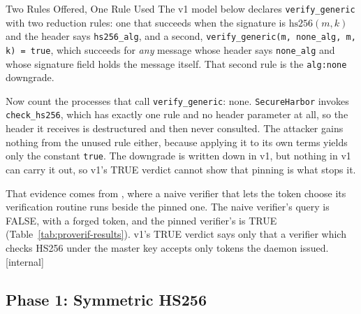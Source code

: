 \documentclass[11pt,a4paper]{article}
\theoremstyle{definition}
\begin{document}
\begin{pdexample}{Two Rules Offered, One Rule Used}
\setlength{\parskip}{4pt plus 1pt}
The v1 model below declares \texttt{verify\_generic} with two reduction rules:
one that succeeds when the signature is $\mathrm{hs256}(m,k)$ and the header
says \texttt{hs256\_alg}, and a second, \texttt{verify\_generic(m, none\_alg,
m, k) = true}, which succeeds for \emph{any} message whose header says
\texttt{none\_alg} and whose signature field holds the message itself. That second
rule is the \texttt{alg:none} downgrade.

Now count the processes that call \texttt{verify\_generic}: none.
\texttt{SecureHarbor} invokes \texttt{check\_hs256}, which has exactly one rule
and no header parameter at all, so the header it receives is destructured and
then never consulted. The attacker gains nothing from the unused rule either,
because applying it to its own terms yields only the constant \texttt{true}.
The downgrade is written down in v1, but nothing in v1 can carry it out, so
v1's TRUE verdict cannot show that pinning is what stops it.

That evidence comes from , where
a naive verifier that lets the token choose its verification routine runs
beside the pinned one. The naive verifier's query is FALSE, with a forged
token, and the pinned verifier's is TRUE (Table~\ref{tab:proverif-results}).
v1's TRUE verdict says only that a verifier which checks HS256 under the master
key accepts only tokens the daemon issued. [internal]
\end{pdexample}

\subsection{Phase 1: Symmetric HS256}
\end{document}
